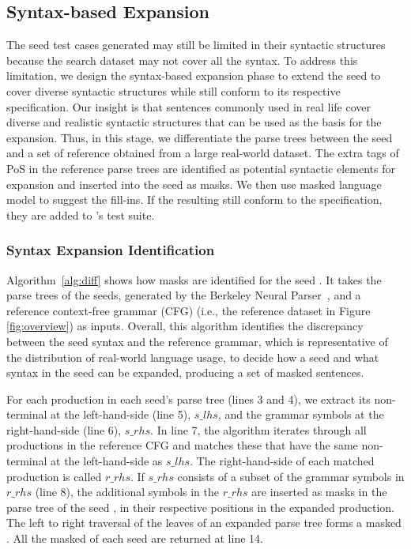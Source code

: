 \subsection{Syntax-based \Sent Expansion}
\label{sec:sent-exp}

The seed test cases generated 
may still be limited in their syntactic structures because the search dataset may not cover all the syntax. To address this limitation, we design the syntax-based \sent expansion
phase to extend the seed \sents to cover diverse syntactic structures while still conform to its respective \lc specification.
Our insight is that sentences commonly used in real life cover diverse and realistic syntactic structures that can be used as the basis for the expansion. Thus, in this stage, we differentiate the
parse trees between the seed \sents and a set of reference \sents
obtained from a large real-world dataset. The extra tags of PoS in the reference
parse trees are identified as potential syntactic elements for
expansion and inserted into the seed \sents as masks. We then use
masked language model to suggest the fill-ins. If the resulting
\sents still conform to the \lc specification,
they are added to \tool's test suite.

\subsubsection{Syntax Expansion Identification}

Algorithm~\ref{alg:diff} shows how masks are identified for the seed
\sents.  It takes the parse trees of the seeds, generated by the
Berkeley Neural
Parser~\cite{kitaev2018seedparser,kitaev2019seedparser}, and a
reference context-free grammar (CFG) (i.e., the reference dataset in Figure \ref{fig:overview}) as inputs.
Overall, this algorithm identifies the discrepancy between the seed syntax 
and the reference grammar, which is representative of the distribution of real-world language usage, to decide how a seed and what syntax in the seed can be expanded, producing a set of masked sentences.



For each production in each seed's parse tree (lines 3 and 4), we
extract its non-terminal at the left-hand-side (line 5), $s\_lhs$, and
the grammar symbols at the right-hand-side (line 6), $s\_rhs$. In line
7, the algorithm iterates through all productions in the reference
CFG and matches these that have the same non-terminal
at the left-hand-side as $s\_lhs$.  The right-hand-side of each
matched production is called $r\_rhs$.  If $s\_rhs$ consists of a
subset of the grammar symbols in $r\_rhs$ (line 8), the additional
symbols in the $r\_rhs$ are inserted as masks in the parse tree of
the seed \sent, in their respective positions in the expanded production.
The left to right traversal of the leaves of an expanded parse tree
forms a masked \sent.
All the masked \sents of each seed are returned at line 14.

